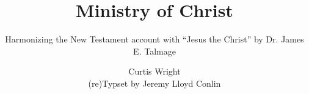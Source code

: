 \documentclass[8pt]{scrartcl}
\title{Ministry of Christ}
\subtitle{Harmonizing the New Testament account with ``Jesus the Christ'' by Dr. James E. Talmage}
\author{\Huge Curtis Wright\\\small (re)Typset by Jeremy Lloyd Conlin}
\date{}
\begin{document}
\pagestyle{empty}
\maketitle


\begin{landscape}

\end{landscape}

\begin{comment}
\begin{longtable}[h]{lllW K E N}
    \toprule
    \multicolumn{1}{c}{Events} & \multicolumn{1}{c}{Locale} & Page & \multicolumn{1}{l}{Matthew} & \multicolumn{1}{l}{Mark} & \multicolumn{1}{l}{Luke} & \multicolumn{1}{l}{John} \\
    \midrule
\endhead
    \bottomrule
\endfoot
    \bottomrule
\endlastfoot
1:1 & 1:1 & 1:1 & 1:1 & 1:1 & 1:1 & 1:1 \\
1:2 & 1:2 & 1:2 & 1:2 & 1:2 & 1:2 & 1:2 \\
1:3 & 1:3 & 1:3 & 1:3 & 1:3 & 1:3 & 1:3 \\
\end{longtable}
\end{comment}
\end{document}
